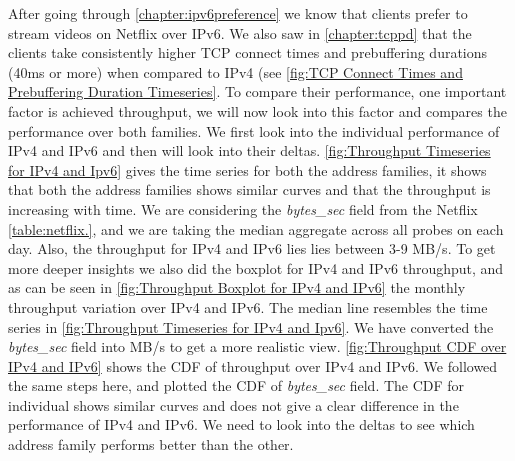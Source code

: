 After going through \cref{chapter:ipv6preference} we know that clients prefer to stream videos on Netflix over IPv6. We also saw in \cref{chapter:tcppd} that the clients take consistently higher TCP connect times and prebuffering durations
(40ms or more) when compared to IPv4 (see \cref{fig:TCP Connect Times and Prebuffering Duration Timeseries}. To compare their performance, one important factor is achieved throughput, we will now look into this factor and compares the performance over both families.
We first look into the individual performance of IPv4 and IPv6 and then will look into their deltas. \cref{fig:Throughput Timeseries for IPv4 and Ipv6} gives the time series for both the address families, it shows that both the address families shows similar curves and that the throughput is increasing with time.
We are considering the \textit{bytes\_sec} field from the Netflix \cref{table:netflix.}, and we are taking the median aggregate across all probes on each day. Also, the throughput for IPv4 and IPv6 lies lies between 3-9 MB/s. To get more deeper insights
we also did the boxplot for IPv4 and IPv6 throughput, and as can be seen in \cref{fig:Throughput Boxplot for IPv4 and IPv6} the monthly throughput variation over IPv4 and IPv6. The median line resembles the time series in \cref{fig:Throughput Timeseries for IPv4 and Ipv6}. We have 
converted the \textit{bytes\_sec} field into MB/s to get a more realistic view. \cref{fig:Throughput CDF over IPv4 and IPv6} shows the CDF of throughput over IPv4 and IPv6. We followed the same steps here,
and plotted the CDF of \textit{bytes\_sec} field. The CDF for individual shows similar curves and does not give a clear difference in the performance of IPv4 and IPv6. 
We need to look into the deltas to see which address family performs better than the other.
 
